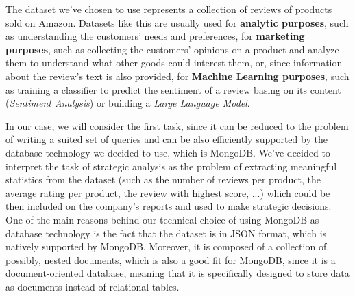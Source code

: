 The dataset we've chosen to use represents a collection of reviews of products sold on Amazon. 
Datasets like this are usually used for \textbf{analytic purposes}, such as understanding the customers' needs and preferences, for \textbf{marketing purposes}, such as collecting the customers' opinions on a product and analyze them to understand what other goods could interest them, or, since information about the review's text is also provided, for \textbf{Machine Learning purposes}, such as training a classifier to predict the sentiment of a review basing on its content (\textit{Sentiment Analysis}) or building a \textit{Large Language Model}.

In our case, we will consider the first task, since it can be reduced to the problem of writing a suited set of queries and can be also efficiently supported by the database technology we decided to use, which is MongoDB.
We've decided to interpret the task of strategic analysis as the problem of extracting meaningful statistics from the dataset (such as the number of reviews per product, the average rating per product, the review with highest score, ...) which could be then included on the company's reports and used to make strategic decisions.\\

One of the main reasons behind our technical choice of using MongoDB as database technology is the fact that the dataset is in JSON format, which is natively supported by MongoDB. 
Moreover, it is composed of a collection of, possibly, nested documents, which is also a good fit for MongoDB, since it is a document-oriented database, meaning that it is specifically designed to store data as documents instead of relational tables.